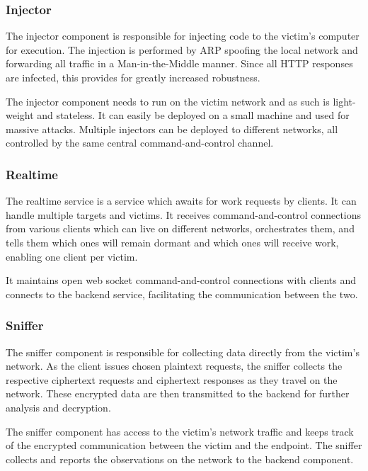 \documentclass[conference, letterpaper, 10pt]{IEEEtran}
\begin{document}
\subsubsection{Injector}

The injector component is responsible for injecting code to the victim's
computer for execution. The injection is performed by ARP spoofing the local
network and forwarding all traffic in a Man-in-the-Middle manner. Since all HTTP
responses are infected, this provides for greatly increased robustness.

The injector component needs to run on the victim network and as such is
light-weight and stateless. It can easily be deployed on a small machine and
used for massive attacks. Multiple injectors can be deployed to different
networks, all controlled by the same central command-and-control channel.

\subsubsection{Realtime}

The realtime service is a service which awaits for work requests by clients. It
can handle multiple targets and victims. It receives command-and-control
connections from various clients which can live on different networks,
orchestrates them, and tells them which ones will remain dormant and which ones
will receive work, enabling one client per victim.

It maintains open web socket command-and-control connections with clients and
connects to the backend service, facilitating the communication between the two.

\subsubsection{Sniffer}

The sniffer component is responsible for collecting data directly from the
victim's network. As the client issues chosen plaintext requests, the sniffer
collects the respective ciphertext requests and ciphertext responses as they
travel on the network. These encrypted data are then transmitted to the backend
for further analysis and decryption.

The sniffer component has access to the victim's network traffic and keeps track
of the encrypted communication between the victim and the endpoint. The sniffer
collects and reports the observations on the network to the backend component.
\end{document}
